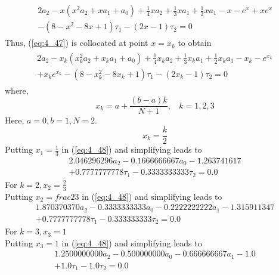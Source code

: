 \documentclass[12pt]{report}
\newcommand{\sps}{\\[0.2cm]}
\newcommand{\refn}[1]{(\ref{#1})}
\newcommand{\refx}[1]{\refn{eq:#1}}
\begin{document}
	\begin{eqnarray}
		\begin{array}{c}
			2a_2 - x(x^2a_2 + xa_1 +a_0) + \frac{1}{4}xa_2 + \frac{1}{3}xa_1 + \frac{1}{2}xa_1 - x - e^x + xe^x\\
			- (8-x^2 - 8x + 1)\tau_1 - (2x-1)\tau_2 = 0~~~~~~~~~~~~~~~
		\end{array}
		\label{eq:4_47}
	\end{eqnarray}
	Thus, \refx{4_47} is collocated at point $x=x_k$ to obtain
	\begin{eqnarray}
		\begin{array}{c}
			2a_2 - x_k(x_k^2a_2 + x_ka_1 +a_0) + \frac{1}{4}x_ka_2 + \frac{1}{3}x_ka_1 + \frac{1}{2}x_ka_1 - x_k - e^{x_k} \\
			+ x_ke^{x_k}- (8-x_k^2 - 8x_k + 1)\tau_1 - (2x_k-1)\tau_2 = 0~~~~~~~~~~
		\end{array}
		\label{eq:4_48}
	\end{eqnarray}
	where,
	\begin{equation}
		x_k = a + \frac{(b-a)k}{N+1}, ~~~~ k=1,2,3 \label{eq:4_49}
	\end{equation}
	Here, $a=0, b=1, N=2.$\sps
	\begin{equation*}
		x_k = \frac{k}{2}
	\end{equation*}
	Putting $x_1=\frac{1}{3}$ in \refx{4_48} and simplifying leads to
	\begin{equation}
		\begin{array}{c}
			2.046296296a_2 - 0.1666666667a_0 - 1.263741617 \\
			+ 0.7777777778\tau_1 - 0.3333333333\tau_2 = 0.0
		\end{array}
		\label{eq:4_50}
	\end{equation}
	\newpage
	For $k=2, x_2 = \frac{2}{3}$\sps
	Putting $x_2=frac{2}{3}$ in \refx{4_48} and simplifying leads to 
	\begin{equation}
		\begin{array}{c}
			1.870370370a_2 - 0.3333333333a_0 - 0.2222222222a_1 - 1.315911347\\
			 + 0.7777777778\tau_1 - 0.333333333\tau_2 = 0.0
		\end{array}
		\label{eq:4_51}
	\end{equation}
	For $k=3, x_3 = 1$\sps
	Putting $x_3=1$ in \refx{4_48} and simplifying leads to 
	\begin{equation}
		\begin{array}{c}
			1.2500000000a_2 - 0.500000000a_0 - 0.666666667a_1 - 1.0\\
			+ 1.0\tau_1 - 1.0\tau_2 = 0.0
		\end{array}
		\label{eq:4_52}
	\end{equation}
\end{document}
